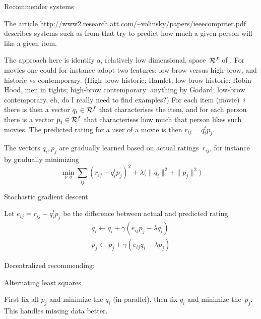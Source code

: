 \cite{Sprint:classifier,ScalParC}

 {Recommender systems}

The article 
\url{http://www2.research.att.com/~volinsky/papers/ieeecomputer.pdf}
describes systems such as from 
that try to predict how much a given person will like a given item.

The approach here is identify a, relatively low dimensional, space~${\cal R}^f$
of . For movies one could for instance adopt two features:
low-brow versus high-brow, and historic vs contemporary.
(High-brow historic: Hamlet; low-brow historic: Robin Hood, men in tights; 
high-brow contemporary: anything by Godard; low-brow contemporary, eh, 
do I really need to find examples?)
For each item (movie)~$i$ there is then a vector $q_i\in{\cal R}^f$ that characterises
the item, and for each person there is a vector $p_j\in{\cal R}^f$ that
characterises how much that person likes such movies. The predicted rating
for a user of a movie is then $r_{ij}=q_i^tp_j$.

The vectors $q_i,p_j$ are gradually learned based on actual
ratings~$r_{ij}$, for instance by gradually minimizing
\[ \min_{p,q} \sum_{ij} (r_{ij}-q_i^tp_j)^2+
    \lambda \bigl( \|q_i\|^2+\|p_j\|^2 \bigr)
\]

 {Stochastic gradient descent}

Let $e_{ij}=r_{ij}-q_i^tp_j$ be the difference between actual and predicted rating.
\[
\begin{array}{l}
  q_i\leftarrow q_i+\gamma (e_{ij}p_j-\lambda q_i)\\
  p_j\leftarrow p_j+\gamma (e_{ij}q_i-\lambda p_j)
\end{array}
\]

Decentralized recommending:~\cite{Zheng:2016arXiv:decentral-recommend}

 {Alternating least squares}

First fix all $p_j$ and minimize the $q_i$ (in parallel),
then fix $q_i$ and minimize the~$p_j$.
This handles missing data better.

